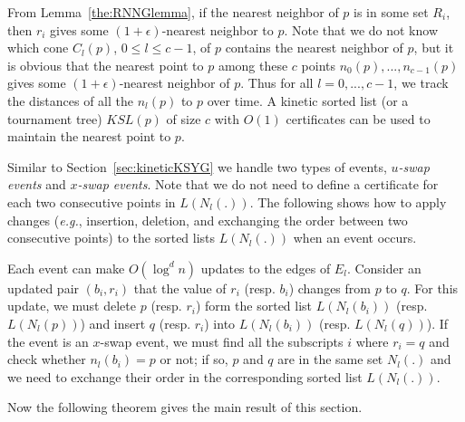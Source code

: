 \documentclass[preprint,12pt]{elsarticle}
\newcommand{\eg}{\emph{e.g.}}
\begin{document}
From Lemma~\ref{the:RNNGlemma}, if the nearest neighbor of $p$ is in some set $R_i$, then $r_i$ gives some $(1+\epsilon)$-nearest neighbor to $p$. Note that we do not know which cone $C_l(p)$, $0\leq l\leq c-1$, of $p$ contains the nearest neighbor of $p$, but it is obvious that the nearest point to $p$ among these $c$ points $n_0(p),...,n_{c-1}(p)$ gives some $(1+\epsilon)$-nearest neighbor of $p$. Thus for all $l=0,...,c-1$, we track the distances of all the $n_l(p)$ to $p$ over time. A kinetic sorted list (or a tournament tree) $KSL(p)$ of size $c$ with $O(1)$ certificates can be used to maintain the nearest point to $p$. 

Similar to Section~\ref{sec:kineticKSYG} we handle two types of events, \textit{$u$-swap events} and \textit{$x$-swap events}. Note that we do not need to define a certificate for each two consecutive points in $L(N_l(.))$.  The following shows how to apply changes (\eg, insertion, deletion, and exchanging the order between two consecutive points) to the sorted lists $L(N_l(.))$ when an event occurs.

Each event can make $O(\log^d n)$ updates to the edges of $E_l$. Consider an updated pair $(b_i,r_i)$ that the value of $r_i$ (resp. $b_i$) changes from $p$ to $q$. For this update, we must delete $p$ (resp. $r_i$) form the sorted list $L(N_l(b_i))$ (resp. $L(N_l(p))$) and insert $q$ (resp. $r_i$) into $L(N_l(b_i))$ (resp. $L(N_l(q))$). If the event is an $x$-swap event, we must find all the subscripts $i$ where $r_i=q$ and check whether $n_l(b_i)=p$ or not; if so, $p$ and $q$ are in the same set $N_l(.)$ and we need to exchange their order in the corresponding sorted list $L(N_l(.))$. 

Now the following theorem gives the main result of this section. 
\end{document}
